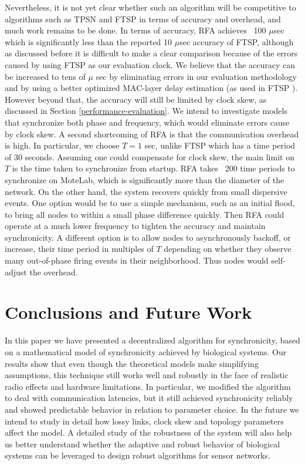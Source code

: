 \documentclass{sig-alternate}
\begin{document}
{%

Nevertheless, it is not yet clear whether such an algorithm will be
competitive to algorithms such as TPSN and FTSP in terms of accuracy
and overhead, and much work remains to be done. In terms of accuracy,
RFA achieves ~100 $\mu$sec which is significantly less than the
reported 10 $\mu$sec accuracy of FTSP, although as discussed before it
is difficult to make a clear comparison because of the errors caused
by using FTSP as our evaluation clock. We believe that the accuracy
can be increased to tens of $\mu$ sec by eliminating errors in our
evaluation methodology and by using a better optimized MAC-layer delay
estimation (as used in FTSP \cite{ftsp}).  However beyond that, the
accuracy will still be limited by clock skew, as discussed in Section
\ref{performance-evaluation}. We intend to investigate models that
synchronize both phase and frequency, which would eliminate errors
cause by clock skew. A second shortcoming of RFA is that the
communication overhead is high. In particular, we choose $T=1$ sec,
unlike FTSP which has a time period of 30 seconds. Assuming one could
compensate for clock skew, the main limit on $T$ is the time taken to
synchronize from startup. RFA takes ~200 time periods to synchronize
on MoteLab, which is significantly more than the diameter of the
network. On the other hand, the system recovers quickly from small
dispersive events. One option would be to use a simple mechanism, such
as an initial flood, to bring all nodes to within a small phase
difference quickly. Then RFA could operate at a much lower frequency
to tighten the accuracy and maintain synchronicity. A different option
is to allow nodes to asynchronously backoff, or increase, their time
period in multiples of $T$ depending on whether they observe many
out-of-phase firing events in their neighborhood. Thus nodes would
self-adjust the overhead.


\section{Conclusions and Future Work}

In this paper we have presented a decentralized algorithm for
synchronicity, based on a mathematical model of synchronicity achieved
by biological systems. Our results show that even though the
theoretical models make simplifying assumptions, this technique still
works well and robustly in the face of realistic radio effects and
hardware limitations. In particular, we modified the algorithm to deal
with communication latencies, but it still achieved synchronicity
reliably and showed predictable behavior in relation to parameter
choice. In the future we intend to study in detail how lossy links,
clock skew and topology parameters affect the model. A detailed study
of the robustness of the system will also help us better understand
whether the adaptive and robust behavior of biological systems can be
leveraged to design robust algorithms for sensor networks.

}
\end{document}
